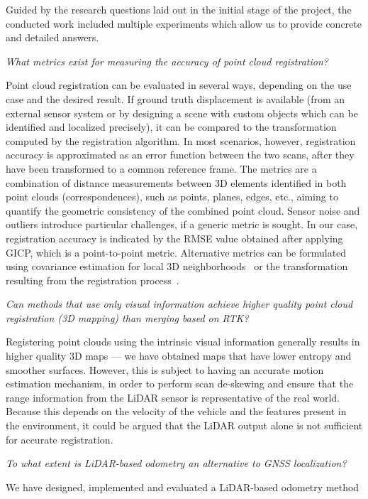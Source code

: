 Guided by the research questions laid out in the initial stage of the project, the conducted work included multiple experiments which allow us to provide concrete and detailed answers.
\begin{compactenum}
    \item \textit{What metrics exist for measuring the accuracy of point cloud registration?}

    Point cloud registration can be evaluated in several ways, depending on the use case and the desired result. If ground truth displacement is available (\eg from an external sensor system or by designing a scene with custom objects which can be identified and localized precisely), it can be compared to the transformation computed by the registration algorithm.
    In most scenarios, however, registration accuracy is approximated as an error function between the two scans, after they have been transformed to a common reference frame. The metrics are a combination of distance measurements between 3D elements identified in both point clouds (correspondences), such as points, planes, edges, etc., aiming to quantify the geometric consistency of the combined point cloud. Sensor noise and outliers introduce particular challenges, if a generic metric is sought. In our case, registration accuracy is indicated by the RMSE value obtained after applying GICP, which is a point-to-point metric. Alternative metrics can be formulated using covariance estimation for local 3D neighborhoods~\cite{adolfsson2021coral} or the transformation resulting from the registration process~\cite{censi2007accurate}.

    \item \textit{Can methods that use only visual information achieve higher quality point cloud registration (3D mapping) than merging based on RTK?}

    Registering point clouds using the intrinsic visual information generally results in higher quality 3D maps --- we have obtained maps that have lower entropy and smoother surfaces. However, this is subject to having an accurate motion estimation mechanism, in order to perform scan de-skewing and ensure that the range information from the LiDAR sensor is representative of the real world. Because this depends on the velocity of the vehicle and the features present in the environment, it could be argued that the LiDAR output alone is not sufficient for accurate registration.

    \item \textit{To what extent is LiDAR-based odometry an alternative to GNSS localization?}

    We have designed, implemented and evaluated a LiDAR-based odometry method

\end{compactenum}


